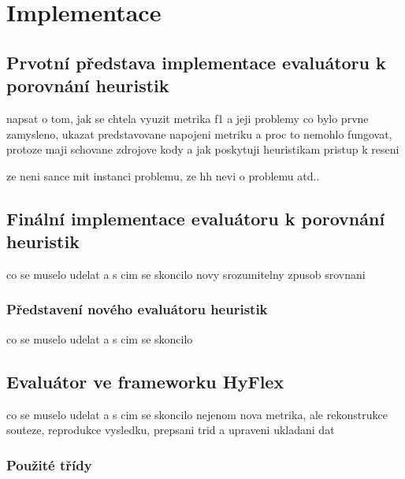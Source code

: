 \chapter{Implementace}

\section{Prvotní představa implementace evaluátoru k porovnání heuristik}
napsat o tom, jak se chtela vyuzit metrika f1 a jeji problemy
co bylo prvne zamysleno, ukazat predstavovane napojeni metriku a proc
to nemohlo fungovat, protoze maji schovane zdrojove kody a jak poskytuji heuristikam pristup k reseni

ze neni sance mit instanci problemu, ze hh nevi o problemu atd..

\section{Finální implementace evaluátoru k porovnání heuristik}
co se muselo udelat a s cim se skoncilo
novy srozumitelny zpusob srovnani

\subsection{Představení nového evaluátoru heuristik}
co se muselo udelat a s cim se skoncilo

\section{Evaluátor ve frameworku HyFlex}
co se muselo udelat a s cim se skoncilo
nejenom nova metrika, ale rekonstrukce souteze, reprodukce vysledku, prepsani trid a 
upraveni ukladani dat
\subsection{Použité třídy}


